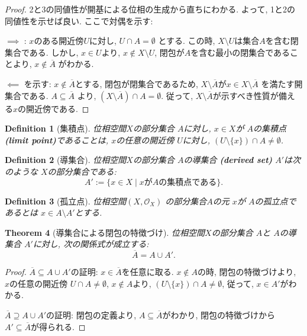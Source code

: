 \documentclass[lualatex]{ltjsbook}
\newcommand{\cl}[1]{\overline{ #1}  }
\newtheorem{theorem}{Theorem}[chapter]
\newtheorem{definition}[theorem]{Definition}
\theoremstyle{remark}
\theoremstyle{plain}
\begin{document}
\begin{proof}
	2と3の同値性が開基による位相の生成から直ちにわかる. よって,  1と2の同値性を示せば良い.
ここで対偶を示す:

$\implies$ : $x$のある開近傍$U$に対し,   $U \cap A = \emptyset$ とする. 
この時,   $X \setminus U$は集合$A$を含む閉集合である. 
しかし,   $x \in U $より,  $x \not\in X \setminus U$,  閉包が$A$を含む最小の閉集合であることより,  $x \not\in \cl{A}$ がわかる.

$\impliedby$ を示す: $x \not\in \cl{A} $とする,  閉包が閉集合であるため,  $X \setminus \cl{A}$が$x \in X \setminus \cl{A}$ を満たす開集合である. 
$A \subseteq \cl{A}$ より,  $\left( X\setminus \cl{A} \right) \cap A = \emptyset$. 
従って,  $X \setminus \cl{A}$が示すべき性質が備える$x$の開近傍である.
	
\end{proof}


\begin{definition}[集積点]
	位相空間$X$の部分集合 $A$に対し,   $x \in X$が $A$の集積点\textbf{(limit point)}であることは, 
$x$の任意の開近傍 $U$に対し,   $\left( U\setminus \{x\}  \right) \cap A \neq \emptyset $.
\end{definition}

\begin{definition}[導集合]
	位相空間$X$の部分集合 $A$の導集合 \textbf{(derived set)} $A'$は次のような $X$の部分集合である:
	 \[
	A' := \{x \in X  \mid  x がAの集積点である\} 
	.\] 
\end{definition}

\begin{definition}[孤立点]
	位相空間$\left( X ,  \mathcal{O}_{X} \right)$ の部分集合$A$の元 $x$が $A$の孤立点であるとは $x \in  A\setminus A'$とする.
\end{definition}

\begin{theorem}[導集合による閉包の特徴づけ]
	位相空間$X$の部分集合 $A$と $A$の導集合 $A'$に対し,  次の関係式が成立する:
	\[
	\cl{A} = A \cup A'
	.\] 
\end{theorem}

\begin{proof}
	$\cl{A} \subseteq A \cup A'$の証明:  $x \in \cl{A}$を任意に取る.  
	$x \not\in  A $の時,  閉包の特徴づけより,  $x$の任意の開近傍 $U \cap A \neq \emptyset$,  $x \not\in  A$より,  $\left( U \setminus \{x\}  \right) \cap A \neq \emptyset $,  従って,  $x \in A'$がわかる.

	 $\cl{A} \supseteq A \cup A'$の証明: 閉包の定義より,   $A \subseteq \cl{A}$がわかり,  閉包の特徴づけから $A' \subseteq \cl{A}$が得られる.

\end{proof}
\end{document}
